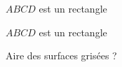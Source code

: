 
\begin{mental}

\( ABCD\) est un rectangle

\begin{center}                                                                                                                                                                                                                                                                                                                                                           
\end{center} 

\( ABCD\) est un rectangle

\begin{center}
   
\end{center}

    Aire des surfaces grisées ?

\end{mental}
